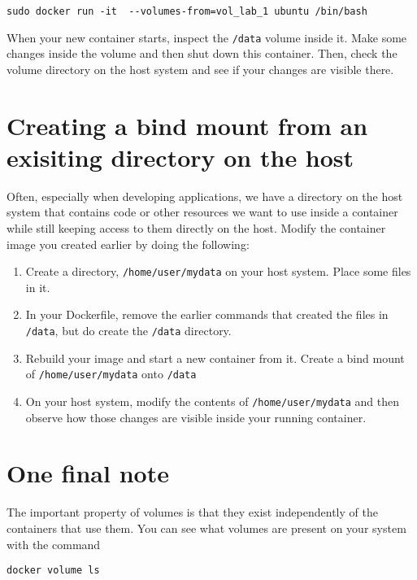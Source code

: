 \documentclass{article}
\begin{document}
\begin{verbatim}
sudo docker run -it  --volumes-from=vol_lab_1 ubuntu /bin/bash
\end{verbatim}

When your new container starts, inspect the \texttt{/data} volume inside it.  Make some changes inside the volume and then shut down this container.  Then, check the volume directory on the host system and see if your changes are visible there.

\section{Creating a bind mount from an exisiting directory on the host}
Often, especially when developing applications, we have a directory on the host system that contains code or other resources we want to use inside a container while still keeping access to them directly on the host. Modify the container image you created earlier by doing the following:

\begin{enumerate}
	\item Create a directory, \texttt{/home/user/mydata} on your host system. Place some files in it.
	\item In your Dockerfile, remove the earlier commands that created the files in \texttt{/data}, but do create the \texttt{/data} directory.
	\item Rebuild your image and start a new container from it. Create a bind mount of \texttt{/home/user/mydata} onto \texttt{/data}
	\item On your host system, modify the contents of \texttt{/home/user/mydata} and then observe how those changes are visible inside your running container.
\end{enumerate}

\section{One final note}
The important property of volumes is that they exist independently of the containers that use them. You can see what volumes are present on your system with the command

\texttt{docker volume ls}
\end{document}
